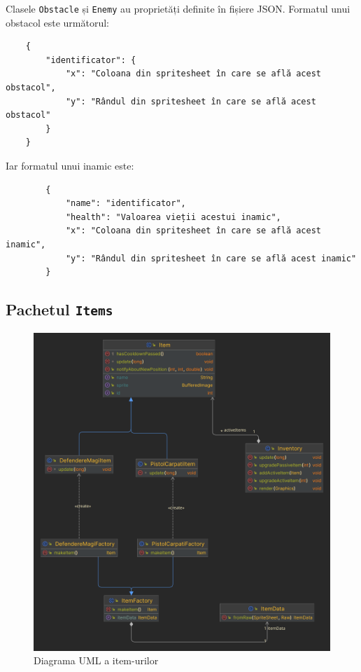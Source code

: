 \documentclass{article}
\begin{document}
    Clasele \texttt{Obstacle} și \texttt{Enemy} au proprietăți definite în fișiere JSON. Formatul
    unui obstacol este următorul:

    \begin{verbatim}
    {
        "identificator": {
            "x": "Coloana din spritesheet în care se află acest obstacol",
            "y": "Rândul din spritesheet în care se află acest obstacol"
        }
    }
    \end{verbatim}

    Iar formatul unui inamic este:
    \begin{verbatim}
        {
            "name": "identificator",
            "health": "Valoarea vieții acestui inamic",
            "x": "Coloana din spritesheet în care se află acest inamic",
            "y": "Rândul din spritesheet în care se află acest inamic"
        }
    \end{verbatim}

    \subsection{Pachetul \texttt{Items}}
    \begin{figure}[H]
        \includegraphics[width=\linewidth]{items-diagram}
        \centering
        \caption{Diagrama UML a item-urilor}
    \end{figure}
\end{document}

